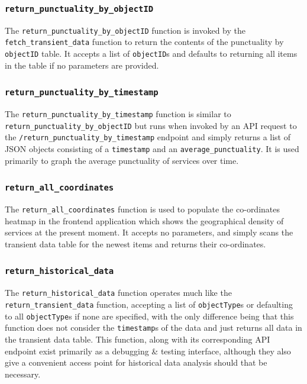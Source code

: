 \documentclass[a4paper,11pt]{report}
\begin{document}
\subsubsection{\texttt{return_punctuality_by_objectID}}
The \verb|return_punctuality_by_objectID| function is invoked by the \verb|fetch_transient_data| function to return the contents of the punctuality by \verb|objectID| table. 
It accepts a list of \verb|objectID|s and defaults to returning all items in the table if no parameters are provided.

\subsubsection{\texttt{return_punctuality_by_timestamp}}
The \verb|return_punctuality_by_timestamp| function is similar to \verb|return_punctuality_by_objectID| but runs when invoked by an API request to the \verb|/return_punctuality_by_timestamp| endpoint and simply returns a list of JSON objects consisting of a \verb|timestamp| and an \verb|average_punctuality|.
It is used primarily to graph the average punctuality of services over time.

\subsubsection{\texttt{return_all_coordinates}}
The \verb|return_all_coordinates| function is used to populate the co-ordinates heatmap in the frontend application which shows the geographical density of services at the present moment.
It accepts no parameters, and simply scans the transient data table for the newest items and returns their co-ordinates.

\subsubsection{\texttt{return_historical_data}}
The \verb|return_historical_data| function operates much like the \verb|return_transient_data| function, accepting a list of \verb|objectType|s or defaulting to all \verb|objectType|s if none are specified, with the only difference being that this function does not consider the \verb|timestamp|s of the data and just returns all data in the transient data table.
This function, along with its corresponding API endpoint exist primarily as a debugging \& testing interface, although they also give a convenient access point for historical data analysis should that be necessary.
\end{document}
